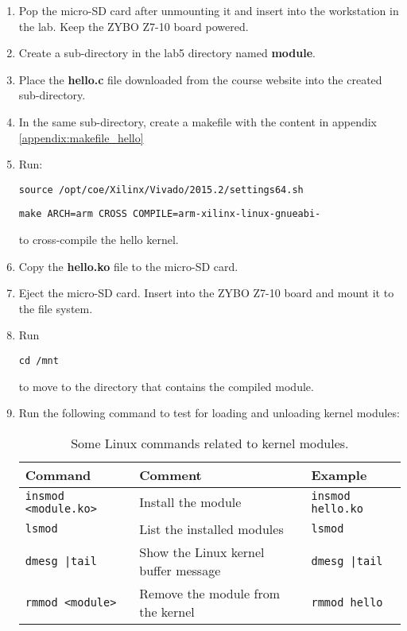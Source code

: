\documentclass[11pt,letterpaper,titlepage]{article}
\begin{document}
\begin{enumerate}
\begin{enumerate}
        \item Pop the micro-SD card after unmounting it and insert into the workstation in the lab. Keep the ZYBO Z7-10 board powered.
        
        \item Create a sub-directory in the lab5 directory named \textbf{module}.
        
        \item Place the \textbf{hello.c} file downloaded from the course website into the created sub-directory.
        
        \item In the same sub-directory, create a makefile with the content in appendix \ref{appendix:makefile_hello}
        
        \item Run:
        
        \verb|source /opt/coe/Xilinx/Vivado/2015.2/settings64.sh|
        
        \verb|make ARCH=arm CROSS COMPILE=arm-xilinx-linux-gnueabi-|
        
        to cross-compile the hello kernel.
        
        \item Copy the \textbf{hello.ko} file to the micro-SD card.
        
        \item Eject the micro-SD card. Insert into the ZYBO Z7-10 board and mount it to the file system.
        
        \item Run
        
        \verb|cd /mnt|
        
        to move to the directory that contains the compiled module.
        
        \item Run the following command to test for loading and unloading kernel modules:
        
        \begin{table}[ht]
        \centering
        \begin{tabular}{@{}lll@{}}
        \toprule
        Command & Comment                              & Example \\ \midrule
        \verb|insmod <module.ko>|        & Install the module                   & \verb|insmod hello.ko|        \\ \midrule
        \verb|lsmod|        & List the installed modules           & \verb|lsmod|        \\ \midrule
        \texttt{dmesg |tail}        & Show the Linux kernel buffer message &    \texttt{dmesg |tail}    \\ \midrule
        \verb|rmmod <module>|        & Remove the module from the kernel    &   \verb|rmmod hello|      \\ \bottomrule
        \end{tabular}
        \caption{Some Linux commands related to kernel modules.}
        \end{table}
        

\end{enumerate}
\end{enumerate}
\end{document}

